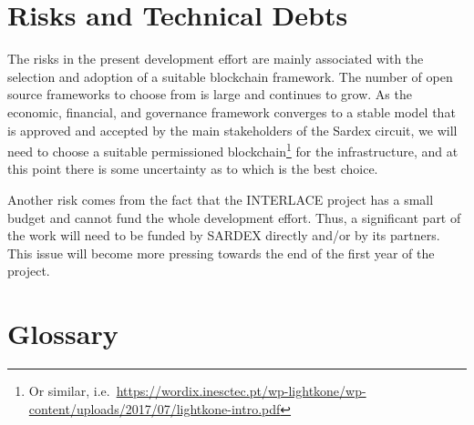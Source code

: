 \section{Risks and Technical Debts}\label{section-technical-risks}
The risks in the present development effort are mainly associated with the selection and adoption of a suitable blockchain framework. The number of open source frameworks to choose from is large and continues to grow. As the economic, financial, and governance framework converges to a stable model that is approved and accepted by the main stakeholders of the Sardex circuit, we will need to choose a suitable permissioned blockchain\footnote{Or similar, i.e.\ \url{https://wordix.inesctec.pt/wp-lightkone/wp-content/uploads/2017/07/lightkone-intro.pdf}} for the infrastructure, and at this point there is some uncertainty as to which is the best choice.

Another risk comes from the fact that the INTERLACE project has a small budget and cannot fund the whole development effort. Thus, a significant part of the work will need to be funded by SARDEX directly and/or by its partners. This issue will become more pressing towards the end of the first year of the project.

\section{Glossary}\label{section-glossary}

